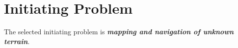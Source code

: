 \section{Initiating Problem}
The selected initiating problem is \textbf{\textit{mapping and navigation of unknown terrain}}.